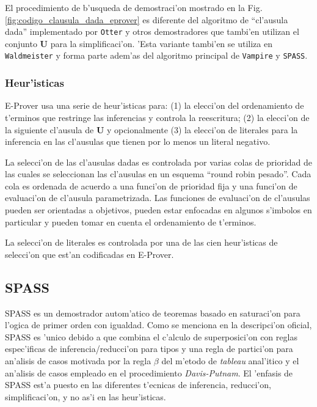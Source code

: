 El procedimiento de b'usqueda de demostraci'on mostrado en la Fig. \ref{fig:codigo_clausula_dada_eprover} es diferente del algoritmo de ``cl'ausula dada'' implementado por \texttt{Otter}\cite{otter} y otros demostradores que tambi'en utilizan el conjunto \textbf{U} para la simplificaci'on. 'Esta variante tambi'en se utiliza en \texttt{Waldmeister}\cite{BH96} y forma parte adem'as del algoritmo principal de \texttt{Vampire} \cite{vampire} y \texttt{SPASS}\cite{spass}.

\subsubsection{Heur'isticas}

E-Prover usa una serie de heur'isticas para: (1) la elecci'on del ordenamiento de t'erminos que restringe las inferencias y controla la reescritura; (2) la elecci'on de la siguiente cl'ausula de \textbf{U} y opcionalmente (3) la elecci'on de literales para la inferencia en las cl'ausulas que tienen por lo menos un literal negativo.

La selecci'on de las cl'ausulas dadas es controlada por varias colas de prioridad de las cuales se seleccionan las cl'ausulas en un esquema ``round robin pesado''. Cada cola es ordenada de acuerdo a una funci'on de prioridad fija y una funci'on de evaluaci'on de cl'ausula parametrizada. Las funciones de evaluaci'on de cl'ausulas pueden ser orientadas a objetivos, pueden estar enfocadas en algunos s'imbolos en particular y pueden tomar en cuenta el ordenamiento de t'erminos. 


La selecci'on de literales es controlada por una de las cien heur'isticas de selecci'on que est'an codificadas en E-Prover.



\subsection{SPASS}

SPASS es un demostrador autom'atico de teoremas basado en saturaci'on para l'ogica de primer orden con igualdad. Como se menciona en la descripci'on oficial, SPASS es 'unico debido a que combina el c'alculo de superposici'on con reglas espec'ificas de inferencia/reducci'on para tipos y una regla de partici'on para an'alisis de casos motivada por la regla $\beta$ del m'etodo de \textit{tableau} anal'itico y el an'alisis de casos empleado en el procedimiento \textit{Davis-Putnam}. El 'enfasis de SPASS est'a puesto en las diferentes t'ecnicas de inferencia, reducci'on, simplificaci'on, y no as'i en las heur'isticas.

